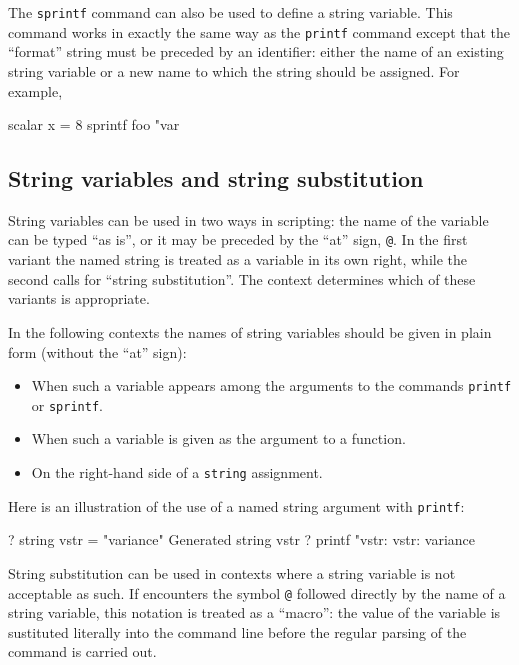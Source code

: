 The \texttt{sprintf} command can also be used to define a string
variable. This command works in exactly the same way as the
\texttt{printf} command except that the ``format'' string must be
preceded by an identifier: either the name of an existing string
variable or a new name to which the string should be assigned.
For example,
%
\begin{code}
scalar x = 8
sprintf foo "var%
\end{code}

\subsection{String variables and string substitution}

String variables can be used in two ways in scripting: the name of the
variable can be typed ``as is'', or it may be preceded by the ``at''
sign, \verb|@|. In the first variant the named string is treated as a
variable in its own right, while the second calls for ``string
substitution''. The context determines which of these variants is
appropriate. 

In the following contexts the names of string variables should be
given in plain form (without the ``at'' sign):

\begin{itemize}
\item When such a variable appears among the arguments to the
  commands \texttt{printf} or \texttt{sprintf}.
\item When such a variable is given as the argument to a function.
\item On the right-hand side of a \texttt{string} assignment.
\end{itemize}

Here is an illustration of the use of a named string argument with
\texttt{printf}:
%
\begin{code}
? string vstr = "variance"
Generated string vstr
? printf "vstr: %
vstr:     variance
\end{code}

String substitution can be used in contexts where a string variable is
not acceptable as such. If  encounters the symbol \verb|@|
followed directly by the name of a string variable, this notation is
treated as a ``macro'': the value of the variable is sustituted
literally into the command line before the regular parsing of the
command is carried out.

